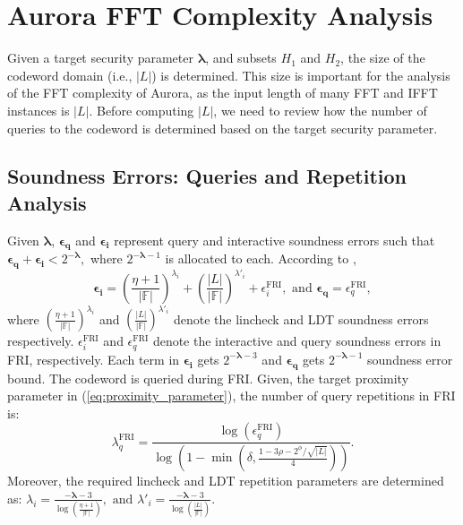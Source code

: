 \section{Aurora FFT Complexity Analysis} \label{Sec:FFT_Calls_in_Aurora}
Given a target security parameter $\boldsymbol{\lambda}$, and subsets $H_1$ and $H_2$,
the size of the codeword domain (i.e., $|L|$) is determined. This size is important for the analysis of the FFT complexity of Aurora, as the input length of many FFT and IFFT instances is $|L|$. Before computing $|L|$, we need to review how the number of queries to the  codeword is determined based on the target security parameter.

\subsection{Soundness Errors: Queries and Repetition Analysis}
Given $\boldsymbol{\lambda}$, $\boldsymbol{\epsilon_q}$ and $\boldsymbol{\epsilon_i}$ represent query and interactive soundness errors such that
\(
\boldsymbol{\epsilon_q} + \boldsymbol{\epsilon_i} < 2^{-\boldsymbol{\lambda}},
\)
where $2^{-\boldsymbol{\lambda} - 1}$ is allocated to each. According to \cite[Theorem 4]{Aurora2019}, 
\[
\boldsymbol{\epsilon_i} = \left(\frac{\eta + 1}{|\mathbb{F}|}\right)^{\lambda_i} + \left(\frac{|L|}{|\mathbb{F}|}\right)^{\lambda'_i} + \epsilon^{\text{FRI}}_i,\text{ and } \boldsymbol{\epsilon_q} = \epsilon^{\text{FRI}}_q,
\]
where $ \left(\frac{\eta + 1}{|\mathbb{F}|}\right)^{\lambda_i}$ and $\left(\frac{|L|}{|\mathbb{F}|}\right)^{\lambda'_i}$ denote the lincheck and LDT soundness errors respectively. $\epsilon^{\text{FRI}}_i$ and   $\epsilon^{\text{FRI}}_q$ denote the interactive and query soundness errors in FRI, respectively. Each term in $\boldsymbol{\epsilon_i}$ gets $2^{-\boldsymbol{\lambda} - 3}$ and $\boldsymbol{\epsilon_q}$ gets $2^{-\boldsymbol{\lambda} - 1}$ soundness error bound. 
The codeword is queried during FRI. 
Given, the target proximity parameter in (\ref{eq:proximity_parameter}), the number of query repetitions in FRI is:
\begin{equation}\label{eq:num_queries}
	\lambda_q^\text{FRI} = \frac{\log(\epsilon^{\text{FRI}}_q)}{\log\left( 1 - \min\left(\delta,  \frac{1- 3\rho - 2^\phi/\sqrt{|L|}}{4} \right)  \right)}.  
\end{equation}
Moreover, the required lincheck and LDT repetition parameters are determined as:
\(
\lambda_i = \frac{-\boldsymbol{\lambda} - 3}{\log\left(\frac{\eta+1}{|\mathbb{F}|}\right)},\text{ and } \lambda'_i = \frac{-\boldsymbol{\lambda} - 3}{\log\left(\frac{|L|}{|\mathbb{F}|}\right)}.
\)



